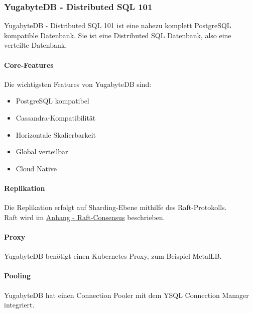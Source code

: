 
\begin{flushleft}
    \subsubsection{YugabyteDB - Distributed SQL 101}
    YugabyteDB - Distributed SQL 101 ist eine nahezu komplett \Gls{PostgreSQL} kompatible Datenbank.
    Sie ist eine Distributed SQL Datenbank, also eine verteilte Datenbank\cite{ZXD6D9KU}.
\end{flushleft}
\begin{flushleft}
    \paragraph{Core-Features}
    Die wichtigsten Features von YugabyteDB sind\cite{N6QKEPAC}:
    \begin{itemize}
        \item \Gls{PostgreSQL} kompatibel
        \item \Gls{Cassandra}-Kompatibilität
        \item Horizontale Skalierbarkeit
        \item Global verteilbar
        \item Cloud Native
    \end{itemize}
\end{flushleft}
\begin{flushleft}
    \paragraph{Replikation}
    Die Replikation erfolgt auf Sharding-Ebene mithilfe des Raft-Protokolls.\\
    Raft wird im \hyperref[subsec:subsec:mraft_consensus]{Anhang - Raft-Consensus} beschrieben.
\end{flushleft}
\begin{flushleft}
    \paragraph{Proxy}
    YugabyteDB benötigt einen \Gls{Kubernetes} Proxy, zum Beispiel \Gls{MetalLB}.
\end{flushleft}
\begin{flushleft}
    \paragraph{Pooling}
    YugabyteDB hat einen \Gls{Connection Pooler} mit dem YSQL Connection Manager integriert\cite{2FQ8JXD7}.
\end{flushleft}
